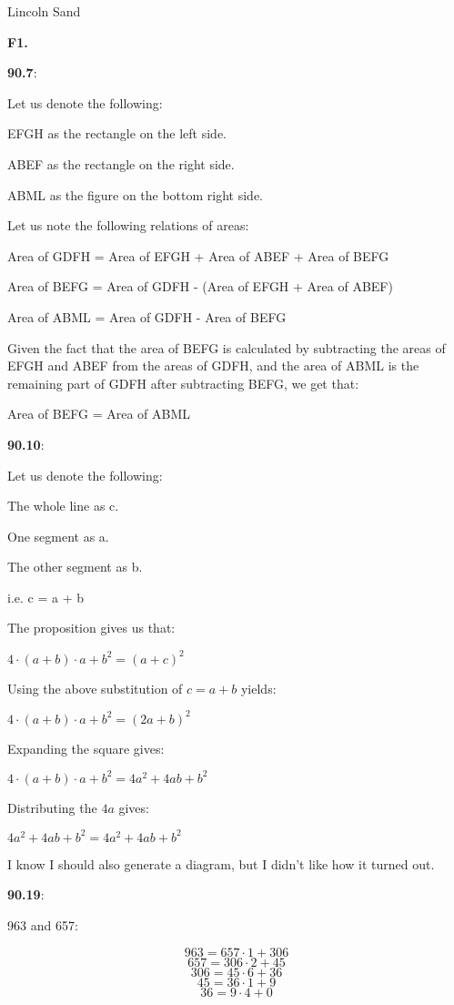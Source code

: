 \documentclass{article}
\begin{document}
\Large{Lincoln Sand}

\normalsize{}

\textbf{F1.}

\textbf{90.7}:

Let us denote the following:

EFGH as the rectangle on the left side.

ABEF as the rectangle on the right side.

ABML as the figure on the bottom right side.


Let us note the following relations of areas:

Area of GDFH = Area of EFGH + Area of ABEF + Area of BEFG

Area of BEFG = Area of GDFH - (Area of EFGH + Area of ABEF)

Area of ABML = Area of GDFH - Area of BEFG


Given the fact that the area of BEFG is calculated by subtracting the areas of
EFGH and ABEF from the areas of GDFH, and the area of ABML is the remaining part
of GDFH after subtracting BEFG, we get that:

Area of BEFG = Area of ABML


\textbf{90.10}:

Let us denote the following:

The whole line as c.

One segment as a.

The other segment as b.

i.e. c = a + b

The proposition gives us that:

$4 \cdot (a + b) \cdot a + b^2 = (a + c)^2$

Using the above substitution of $c = a + b$ yields:

$4 \cdot (a + b) \cdot a + b^2 = (2a + b)^2$

Expanding the square gives:

$4 \cdot (a + b) \cdot a + b^2 = 4a^2 + 4ab + b^2$

Distributing the $4a$ gives:

$4a^2 + 4ab + b^2 = 4a^2 + 4ab + b^2$

I know I should also generate a diagram, but I didn't like how it turned out.

\textbf{90.19}:

963 and 657:

\[963 = 657 \cdot 1 + 306\]
\[657 = 306 \cdot 2 + 45\]
\[306 = 45 \cdot 6 + 36\]
\[45 = 36 \cdot 1 + 9\]
\[36 = 9 \cdot 4 + 0\]
\end{document}
